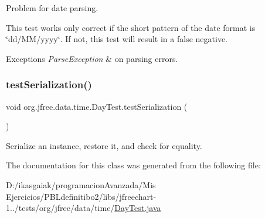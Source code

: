 Problem for date parsing. 

This test works only correct if the short pattern of the date format is \char`\"{}dd/\+M\+M/yyyy\char`\"{}. If not, this test will result in a false negative.


\begin{DoxyExceptions}{Exceptions}
{\em Parse\+Exception} & on parsing errors. \\
\hline
\end{DoxyExceptions}
\mbox{\label{classorg_1_1jfree_1_1data_1_1time_1_1_day_test_a374dbcd1488d96abd1d778213a784a55}} 
\subsubsection{\texorpdfstring{test\+Serialization()}{testSerialization()}}
{\footnotesize\ttfamily void org.\+jfree.\+data.\+time.\+Day\+Test.\+test\+Serialization (\begin{DoxyParamCaption}{ }\end{DoxyParamCaption})}

Serialize an instance, restore it, and check for equality. 

The documentation for this class was generated from the following file\+:\begin{DoxyCompactItemize}
\item 
D\+:/ikasgaiak/programacion\+Avanzada/\+Mis Ejercicios/\+P\+B\+Ldefinitibo2/libs/jfreechart-\/1../tests/org/jfree/data/time/\mbox{\hyperlink{_day_test_8java}{Day\+Test.\+java}}\end{DoxyCompactItemize}
